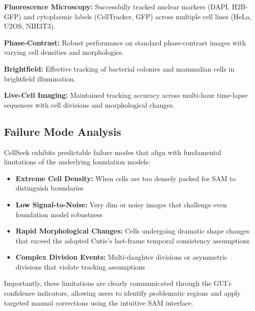 \documentclass[../cellseek_paper.tex]{subfiles}
\begin{document}
\textbf{Fluorescence Microscopy:} Successfully tracked nuclear markers (DAPI, H2B-GFP) and cytoplasmic labels (CellTracker, GFP) across multiple cell lines (HeLa, U2OS, NIH3T3).

\textbf{Phase-Contrast:} Robust performance on standard phase-contrast images with varying cell densities and morphologies.

\textbf{Brightfield:} Effective tracking of bacterial colonies and mammalian cells in brightfield illumination.

\textbf{Live-Cell Imaging:} Maintained tracking accuracy across multi-hour time-lapse sequences with cell divisions and morphological changes.

\subsection{Failure Mode Analysis}

CellSeek exhibits predictable failure modes that align with fundamental limitations of the underlying foundation models:

\begin{itemize}
  \item \textbf{Extreme Cell Density:} When cells are too densely packed for SAM to distinguish boundaries
  \item \textbf{Low Signal-to-Noise:} Very dim or noisy images that challenge even foundation model robustness
  \item \textbf{Rapid Morphological Changes:} Cells undergoing dramatic shape changes that exceed the adapted Cutie's last-frame temporal consistency assumptions
  \item \textbf{Complex Division Events:} Multi-daughter divisions or asymmetric divisions that violate tracking assumptions
\end{itemize}

Importantly, these limitations are clearly communicated through the GUI's confidence indicators, allowing users to identify problematic regions and apply targeted manual corrections using the intuitive SAM interface.
\end{document}
